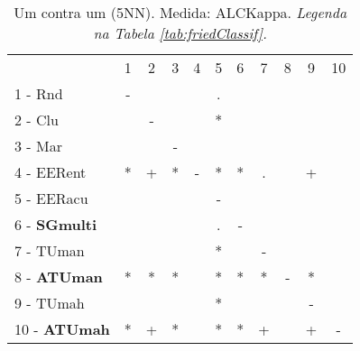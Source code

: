 \begin{table}[h]
\caption{Um contra um (5NN). Medida: ALCKappa. \textit{Legenda na Tabela \ref{tab:friedClassif}.}}
\begin{center}\begin{tabular}{lcc|cc|cc|cc|cc}
 			& 1 & 2 & 3 & 4 & 5 & 6 & 7 & 8 & 9 & 10\\
1 - Rnd  	& - &   &   &   & . &   &   &   &   &   \\
2 - Clu  	&   & - &   &   & * &   &   &   &   &   \\ \hline
3 - Mar  	&   &   & - &   &   &   &   &   &   &   \\
4 - EERent	& * & + & * & - & * & * & . &   & + &   \\ \hline
5 - EERacu	&   &   &   &   & - &   &   &   &   &   \\
6 - \textbf{SGmulti}	&   &   &   &   & . & - &   &   &   &   \\ \hline
7 - TUman	&   &   &   &   & * &   & - &   &   &   \\
8 - \textbf{ATUman}	& * & * & * &   & * & * & * & - & * &   \\ \hline
9 - TUmah	&   &   &   &   & * &   &   &   & - &   \\
10 - \textbf{ATUmah}	& * & + & * &   & * & * & + &   & + & - \\ \hline\end{tabular}
\label{stratsALCKappaFried5NNRedux}
\end{center}
\end{table}